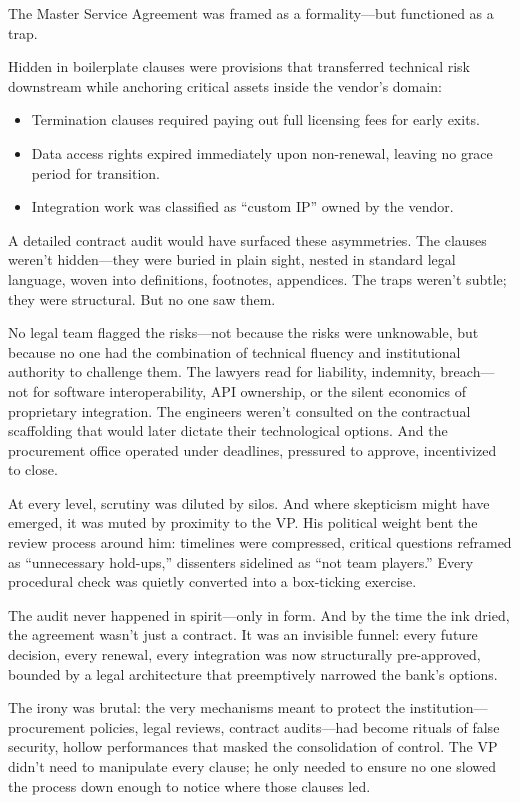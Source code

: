 The Master Service Agreement was framed as a formality—but functioned as a trap.  

Hidden in boilerplate clauses were provisions that transferred technical risk downstream while anchoring critical assets inside the vendor’s domain:  
\begin{itemize}
    \item Termination clauses required paying out full licensing fees for early exits.
    \item Data access rights expired immediately upon non-renewal, leaving no grace period for transition.
    \item Integration work was classified as “custom IP” owned by the vendor.
\end{itemize}

A detailed contract audit would have surfaced these asymmetries. The clauses weren’t hidden—they were buried in plain sight, nested in standard legal language, woven into definitions, footnotes, appendices. The traps weren’t subtle; they were structural. But no one saw them.

No legal team flagged the risks—not because the risks were unknowable, but because no one had the combination of technical fluency and institutional authority to challenge them. The lawyers read for liability, indemnity, breach—not for software interoperability, API ownership, or the silent economics of proprietary integration. The engineers weren’t consulted on the contractual scaffolding that would later dictate their technological options. And the procurement office operated under deadlines, pressured to approve, incentivized to close.

At every level, scrutiny was diluted by silos. And where skepticism might have emerged, it was muted by proximity to the VP. His political weight bent the review process around him: timelines were compressed, critical questions reframed as “unnecessary hold-ups,” dissenters sidelined as “not team players.” Every procedural check was quietly converted into a box-ticking exercise.

The audit never happened in spirit—only in form. And by the time the ink dried, the agreement wasn’t just a contract. It was an invisible funnel: every future decision, every renewal, every integration was now structurally pre-approved, bounded by a legal architecture that preemptively narrowed the bank’s options.

The irony was brutal: the very mechanisms meant to protect the institution—procurement policies, legal reviews, contract audits—had become rituals of false security, hollow performances that masked the consolidation of control. The VP didn’t need to manipulate every clause; he only needed to ensure no one slowed the process down enough to notice where those clauses led.

